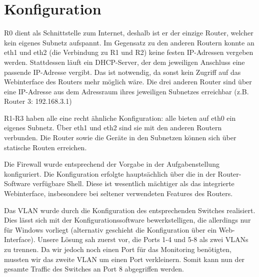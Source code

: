 \documentclass[11pt,a4paper]{article}
\begin{document}
\section{Konfiguration}
R0 dient als Schnittstelle zum Internet, deshalb ist er der
einzige Router, welcher kein eigenes Subnetz aufspannt. Im Gegensatz zu
den anderen Routern konnte an eth1 und eth2 (die Verbindung zu R1 und
R2) keine festen IP-Adressen vergeben werden. Stattdessen läuft ein
DHCP-Server, der dem jeweiligen Anschluss eine passende IP-Adresse
vergibt. Das ist notwendig, da sonst kein Zugriff auf das Webinterface
des Routers mehr möglich wäre. Die drei anderen Router sind über eine
IP-Adresse aus dem Adressraum ihres jeweiligen Subnetzes erreichbar
(z.B. Router 3: 192.168.3.1) \par
	
R1-R3 haben alle eine recht ähnliche Konfiguration: alle bieten
auf eth0 ein eigenes Subnetz. Über eth1 und eth2 sind sie mit den
anderen Routern verbunden. Die Router sowie die Geräte in den
Subnetzen können sich über statische Routen erreichen.
\par
	
Die Firewall wurde entsprechend der Vorgabe in der Aufgabenstellung
konfiguriert. Die Konfiguration erfolgte hauptsächlich über die in der
Router-Software verfügbare Shell. Diese ist wesentlich mächtiger als
das integrierte Webinterface, insbesondere bei seltener verwendeten
Features des Routers.
\par
	
Das VLAN wurde durch die Konfiguration des entsprechenden Switches
realisiert. Dies lässt sich mit der Konfigurationssoftware
bewerkstelligen, die allerdings nur für Windows vorliegt (alternativ
geschieht die Konfiguration über ein Web-Interface). Unsere Lösung sah
zuerst vor, die Ports 1-4 und 5-8 als zwei VLANs zu trennen. Da wir
jedoch noch einen Port für das Monitoring benötigten, mussten wir das
zweite VLAN um einen Port verkleinern. Somit kann nun der gesamte
Traffic des Switches an Port 8 abgegriffen werden. \par
\end{document}
